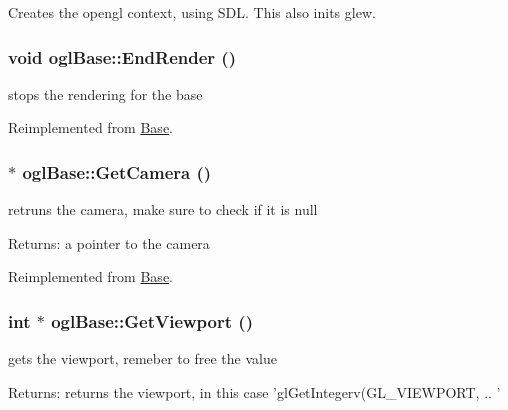 Creates the opengl context, using SDL. This also inits glew. \hypertarget{classogl_base_b631bdff58ff97debfac8de95af16f79}{
\subsubsection[{EndRender}]{\setlength{\rightskip}{0pt plus 5cm}void oglBase::EndRender ()}}
\label{classogl_base_b631bdff58ff97debfac8de95af16f79}


stops the rendering for the base 

Reimplemented from \hyperlink{class_base_18136e695927486c0487eb9224911162}{Base}.\hypertarget{classogl_base_a102dbfe5a17fb2f2954140de4c92895}{
\subsubsection[{GetCamera}]{ $\ast$ oglBase::GetCamera ()}}
\label{classogl_base_a102dbfe5a17fb2f2954140de4c92895}


retruns the camera, make sure to check if it is null \begin{Desc}
\item[Returns:]a pointer to the camera \end{Desc}


Reimplemented from \hyperlink{class_base_1e6c50833404c9b10a4e4451e035fe73}{Base}.\hypertarget{classogl_base_07bd06c4bda42521313f56fcac5b7203}{
\subsubsection[{GetViewport}]{\setlength{\rightskip}{0pt plus 5cm}int $\ast$ oglBase::GetViewport ()}}
\label{classogl_base_07bd06c4bda42521313f56fcac5b7203}


gets the viewport, remeber to free the value \begin{Desc}
\item[Returns:]returns the viewport, in this case 'glGetIntegerv(GL\_\-VIEWPORT, .. ' \end{Desc}


